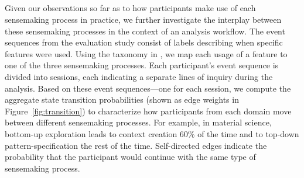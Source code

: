\subsection{}
Given our observations so far as to
how participants
make use of each sensemaking process in practice,
we further investigate the interplay
between these sensemaking processes
in the context of an analysis workflow. %
The event sequences from the evaluation study
consist of labels describing when specific features were used.
Using the taxonomy in , we map each usage of a feature
to one of the three sensemaking processes.
Each participant's event sequence
is divided into sessions,
each indicating a separate lines of inquiry
during the analysis.
Based on these event sequences---one for each session,
we compute the aggregate state transition probabilities
(shown as edge weights in Figure~\ref{fig:transition})
to characterize how participants from each domain
move between different sensemaking processes.
For example, in material science,
bottom-up exploration
leads to context creation 60\% of the time
and to top-down pattern-specification
the rest of the time.
Self-directed edges indicate the probability that the participant
would continue with the same type of sensemaking process.
